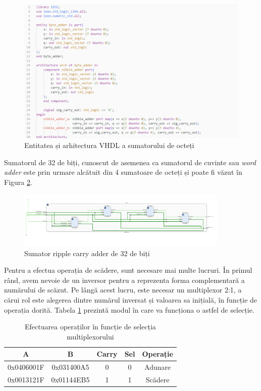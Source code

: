 \documentclass[12pt]{article}
\begin{document}
 \begin{figure}[h!]
 \includegraphics[width=1.0\textwidth]{byteadderVHDL.png}
 \centering
 \caption{Entitatea și arhitectura VHDL a sumatorului de octeți}
 \label{Figura:26}
 \end{figure}
 
Sumatorul de 32 de biți, cunoscut de asemenea ca sumatorul de cuvinte sau \textit{word adder} este prin urmare alcătuit din 4 sumatoare de octeți și poate fi văzut în Figura \ref{Figura:18}.

 \begin{figure}[h!]
 \includegraphics[width=0.9\textwidth]{32bitadder.png}
 \centering
 \caption{Sumator ripple carry adder de 32 de biți}
 \label{Figura:18}
 \end{figure}
 
Pentru a efectua operația de scădere, sunt necesare mai multe lucruri. În primul rând, avem nevoie de un inversor pentru a reprezenta forma complementară a numărului de scăzut. Pe lângă acest lucru, este necesar un multiplexor 2:1, a cărui rol este alegerea dintre numărul inversat și valoarea sa inițială, în funcție de operația dorită. Tabela \ref{Tabela:13} prezintă modul în care va funcționa o astfel de selecție.

\newpage
\begin{table}[h]
\centering
\caption{Efectuarea operaților în funcție de selecția multiplexorului}
\label{Tabela:13}
\begin{tabular}{ ||c|c|c|c|c|| }
 \hline
 A & B & Carry & Sel & Operație\\ 
 \hline  \hline
 0x0406001F & 0x031400A5 & 0 & 0 & Adunare \\
 \hline
 0x0013121F & 0x01144EB5 & 1 & 1 & Scădere \\
 
  \hline  
\end{tabular}
\end{table}
\end{document}
